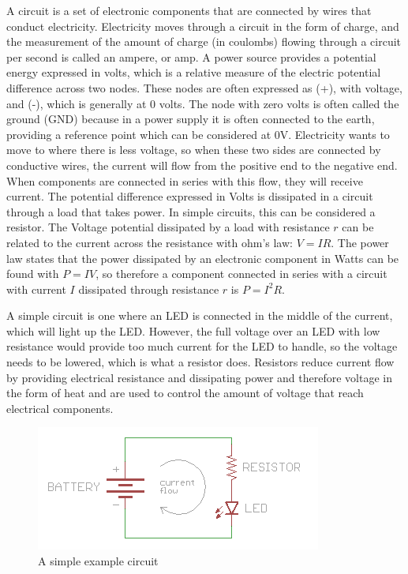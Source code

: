 \documentclass[12pt,]{article}
\begin{document}
A circuit is a set of electronic components that are connected by wires
that conduct electricity. Electricity moves through a circuit in the
form of charge, and the measurement of the amount of charge (in
coulombs) flowing through a circuit per second is called an ampere, or
amp. A power source provides a potential energy expressed in volts,
which is a relative measure of the electric potential difference across
two nodes. These nodes are often expressed as (+), with voltage, and
(-), which is generally at 0 volts. The node with zero volts is often
called the ground (GND) because in a power supply it is often connected
to the earth, providing a reference point which can be considered at 0V.
Electricity wants to move to where there is less voltage, so when these
two sides are connected by conductive wires, the current will flow from
the positive end to the negative end. When components are connected in
series with this flow, they will receive current. The potential
difference expressed in Volts is dissipated in a circuit through a load
that takes power. In simple circuits, this can be considered a resistor.
The Voltage potential dissipated by a load with resistance \(r\) can be
related to the current across the resistance with ohm's law: \(V=IR\).
The power law states that the power dissipated by an electronic
component in Watts can be found with \(P=IV\), so therefore a component
connected in series with a circuit with current \(I\) dissipated through
resistance \(r\) is \(P=I^2R\).

A simple circuit is one where an LED is connected in the middle of the
current, which will light up the LED. However, the full voltage over an
LED with low resistance would provide too much current for the LED to
handle, so the voltage needs to be lowered, which is what a resistor
does. Resistors reduce current flow by providing electrical resistance
and dissipating power and therefore voltage in the form of heat and are
used to control the amount of voltage that reach electrical components.

\begin{figure}[h]

{\centering \includegraphics{assets/simple_circuit} 

}

\caption{\label{fig:figs} A simple example circuit}\label{fig:simple_circuit}
\end{figure}
\end{document}
